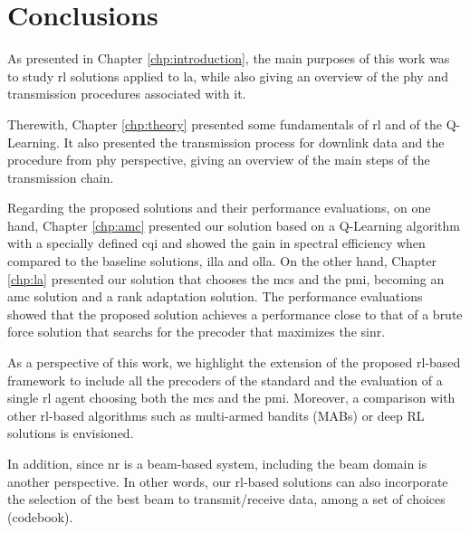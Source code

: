\chapter{Conclusions}%
\label{chp:conclusion}

As presented in Chapter \ref{chp:introduction}, the main purposes of this work was to study \gls{rl} solutions applied to \gls{la}, while also giving an overview of the \gls{phy} and transmission procedures associated with it.

Therewith, Chapter \ref{chp:theory} presented some fundamentals of \gls{rl} and of the Q-Learning.
%
It also presented the transmission process for downlink data and the procedure from \gls{phy} perspective, giving an overview of the main steps of the transmission chain.

Regarding the proposed solutions and their performance evaluations, on one hand, Chapter \ref{chp:amc} presented our solution based on a Q-Learning algorithm with a specially defined \gls{cqi} and showed the gain in spectral efficiency when compared to the baseline solutions, \gls{illa} and \gls{olla}.
%
On the other hand, Chapter \ref{chp:la} presented our solution that chooses the \gls{mcs} and the \gls{pmi}, becoming an \gls{amc} solution and a rank adaptation solution. The performance evaluations showed that the proposed solution achieves a performance close to that of a brute force solution that searchs for the precoder that maximizes the \gls{sinr}.

As a perspective of this work, we highlight the extension of the proposed \gls{rl}-based framework to include all the precoders of the standard \cite{3gpp.38.214} and the evaluation of a single \gls{rl} agent choosing both the \gls{mcs} and the \gls{pmi}.
%
Moreover, a comparison with other \gls{rl}-based algorithms such as multi-armed bandits (MABs) \cite{zhou2015survey} or deep RL solutions \cite{DeepRLSurvey} is envisioned.

In addition, since \gls{nr} is a beam-based system, including the beam domain is another perspective.
%
In other words, our \gls{rl}-based solutions can also incorporate the selection of the best beam to transmit/receive data, among a set of choices (codebook).
